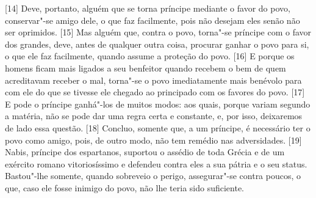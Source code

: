 {[}14{]} Deve, portanto, alguém que se torna príncipe mediante o favor
do povo, conservar"-se amigo dele, o que faz facilmente, pois não desejam
eles senão não ser oprimidos. {[}15{]} Mas alguém que, contra o povo,
torna"-se príncipe com o favor dos grandes, deve, antes de qualquer outra
coisa, procurar ganhar o povo para si, o que ele faz facilmente, quando
assume a proteção do povo. {[}16{]} E porque os homens ficam mais
ligados a seu benfeitor quando recebem o bem de quem acreditavam receber
o mal, torna"-se o povo imediatamente mais benévolo para com ele do que
se tivesse ele chegado ao principado com os favores do povo. {[}17{]} E
pode o príncipe ganhá"-los de muitos modos: aos quais, porque variam
segundo a matéria,
não se pode dar uma regra certa e constante, e, por isso, deixaremos de
lado essa questão. {[}18{]} Concluo, somente que, a um príncipe, é
necessário ter o povo como amigo, pois, de outro modo, não tem remédio
nas adversidades. {[}19{]} Nabis, príncipe dos espartanos, suportou o assédio de toda
Grécia e de um exército romano vitoriosíssimo e defendeu contra eles a
sua pátria e o seu status. Bastou"-lhe somente, quando sobreveio o
perigo, assegurar"-se contra poucos, o que, caso ele fosse inimigo do
povo, não lhe teria sido suficiente.

